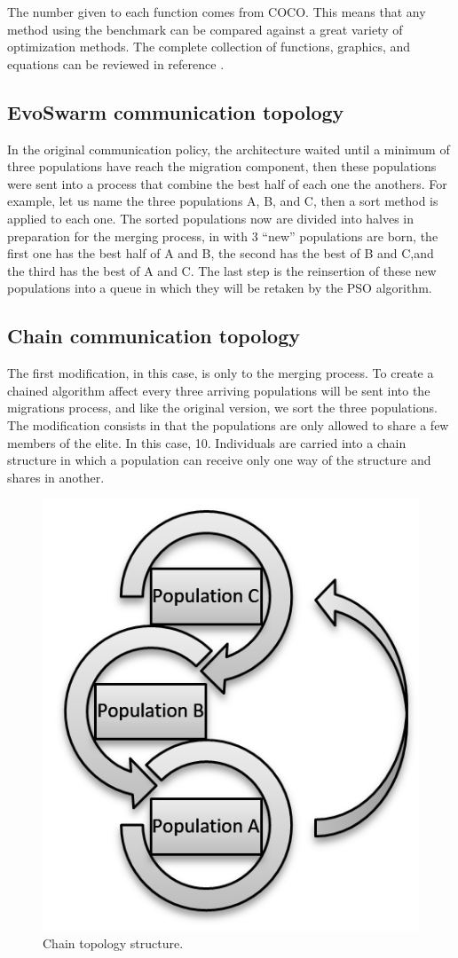 \documentclass[runningheads]{llncs}
\begin{document}
The number given to each function comes from COCO. This means that any method using the benchmark can be compared against a great variety of optimization methods. The complete collection of functions, graphics, and equations can be reviewed in reference \cite{bbob}.

\subsection{EvoSwarm communication topology}
In the original communication policy, the architecture waited until a minimum of three populations have reach the migration component, then these populations were sent into a process that combine the best half of each one the anothers. For example, let us name the three populations A, B, and C, then a sort method is applied to each one. The sorted populations now are divided into halves in preparation for the merging process, in with 3 “new” populations are born, the first one has the best half of A and B, the second has the best of B and C,and the third has the best of A and C. The last step is the reinsertion of these new populations into a queue in which they will be retaken by the PSO algorithm.

\subsection{Chain communication topology}
The first modification, in this case, is only to the merging process. To create a chained algorithm affect every three arriving populations will be sent into the migrations process, and like the original version, we sort the three populations. The modification consists in that the populations are only allowed to share a few members of the elite. In this case, 10. Individuals are carried into a chain structure in which a population can receive only one way of the structure and shares in another.

\begin{figure}
\centering
{}
\includegraphics[width=0.35\linewidth]{Resources/F2.png}
\caption{Chain topology structure.}
\label{fig:example}
\end{figure}
\end{document}
